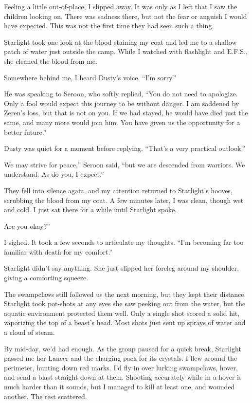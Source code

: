 Feeling a little out-of-place, I slipped away. It was only as I left that I saw the children looking on. There was sadness there, but not the fear or anguish I would have expected. This was not the first time they had seen such a thing.

Starlight took one look at the blood staining my coat and led me to a shallow patch of water just outside the camp. While I watched with flashlight and E.F.S., she cleaned the blood from me.

Somewhere behind me, I heard Dusty’s voice. “I’m sorry.”

He was speaking to Seroon, who softly replied, “You do not need to apologize. Only a fool would expect this journey to be without danger. I am saddened by Zeren’s loss, but that is not on you. If we had stayed, he would have died just the same, and many more would join him. You have given us the opportunity for a better future.”

Dusty was quiet for a moment before replying. “That’s a very practical outlook.”

\leavevmode{}We may strive for peace,” Seroon said, “but we are descended from warriors. We understand. As do you, I expect.”

They fell into silence again, and my attention returned to Starlight’s hooves, scrubbing the blood from my coat. A few minutes later, I was clean, though wet and cold. I just sat there for a while until Starlight spoke.

\leavevmode{}Are you okay?”

I sighed. It took a few seconds to articulate my thoughts. “I’m becoming far too familiar with death for my comfort.”

Starlight didn’t say anything. She just slipped her foreleg around my shoulder, giving a comforting squeeze.

{\br}%
The swampclaws still followed us the next morning, but they kept their distance. Starlight took pot-shots at any eyes she saw peeking out from the water, but the aquatic environment protected them well. Only a single shot scored a solid hit, vaporizing the top of a beast’s head. Most shots just sent up sprays of water and a cloud of steam.

By mid-day, we’d had enough. As the group paused for a quick break, Starlight passed me her Lancer and the charging pack for its crystals. I flew around the perimeter, hunting down red marks. I’d fly in over lurking swampclaws, hover, and send a blast straight down at them. Shooting accurately while in a hover is much harder than it sounds, but I managed to kill at least one, and wounded another. The rest scattered.

